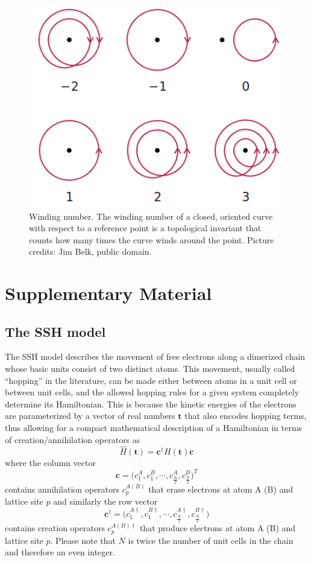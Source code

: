 \documentclass[fleqn,10pt]{wlscirep}
\begin{document}
\begin{figure}%
  \centering
  \includegraphics[width=.37\textwidth]{./phase_diagrams/winding.png}
  \caption{Winding number. The winding number of a closed, oriented curve with respect to a reference point is a topological invariant that counts how many times the curve winds around the point. Picture credits: Jim Belk, public domain.}
\label{fig:winding}
\end{figure}


\section*{Supplementary Material}
\subsection*{The SSH model}
\label{sshapp}

The SSH model  describes the movement of free electrons along a dimerized chain whose basic units consist of two distinct atoms. This movement, usually called ``hopping'' in the literature, can be made either between atoms in a unit cell or between unit cells, and the allowed hopping rules for a given system completely determine its Hamiltonian. This is because the kinetic energies of the electrons are parameterized by a vector of real numbers $\mathbf{t}$ that also encodes hopping terms, thus allowing for a compact mathematical description of a Hamiltonian in terms of creation/annihilation operators as
\begin{equation}
\label{SSH}
\hat{H}(\mathbf{t})=\mathbf{c}^{\dagger}H(\mathbf{t})\mathbf{c}
\end{equation}
where the column vector
\begin{equation*}
\mathbf{c} =\Big(c^{A}_1,c^{B}_1,\cdots,c^{A}_\frac{N}{2},c^{B}_\frac{N}{2}\Big)^T
\end{equation*}
contains annihilation operators $c^{A(B)}_p$ that erase electrons at atom A (B) and lattice site $p$ and similarly the row vector
\begin{equation*}
\mathbf{c}^\dagger =\Big(c^{A\dagger}_1,c^{B\dagger}_1,\cdots,c^{A\dagger}_\frac{N}{2},c^{B\dagger}_\frac{N}{2}\Big)
\end{equation*}
contains creation operators $c^{A(B)\dagger}_p$ that produce electrons at atom A (B) and lattice site $p$. Please note that $N$ is twice the number of unit cells in the chain and therefore an even integer.
\end{document}
